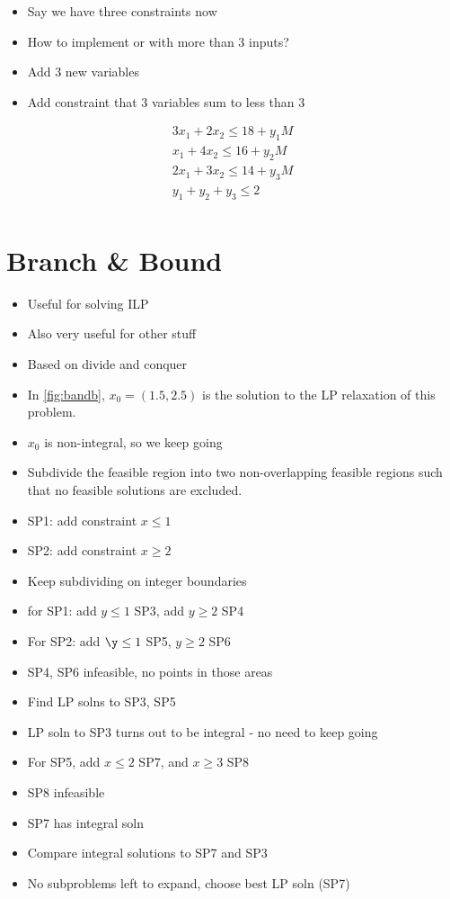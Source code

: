 \documentclass[12pt, letter]{article}
\begin{document}
\begin{itemize}
	\item Say we have three constraints now
	\item How to implement or with more than 3 inputs?
	\item Add 3 new variables
	\item Add constraint that 3 variables sum to less than 3
\end{itemize}
\begin{gather*}
3x_1+2x_2 \le 18 + y_1M \\
x_1+4x_2 \le 16 +y_2M\\
2x_1+3x_2 \le 14 +y_3M\\
y_1+y_2+y_3 \le 2\\
\end{gather*}

\section{Branch \& Bound}%
\label{sec:branch_&_bound}
\begin{itemize}
	\item Useful for solving ILP
	\item Also very useful for other stuff
	\item Based on divide and conquer
	\item In \ref{fig:bandb}, $x_0=(1.5, 2.5)$ is the solution to the LP relaxation of this problem.
	\item $x_0$ is non-integral, so we keep going
	\item Subdivide the feasible region into two non-overlapping feasible regions such that no feasible solutions are excluded.
	\item SP1: add constraint $x \le 1$
	\item SP2: add constraint $x \ge 2$
	\item Keep subdividing on integer boundaries
	\item for SP1: add $y\le 1$ SP3, add $y \ge 2$ SP4
	\item For SP2: add $\y \le 1$ SP5, $y\ge 2$ SP6
	\item SP4, SP6 infeasible, no points in those areas
	\item Find LP solns to SP3, SP5
	\item LP soln to SP3 turns out to be integral - no need to keep going
	\item For SP5, add $x \le 2$ SP7, and $x \ge 3$ SP8
	\item SP8 infeasible
	\item SP7 has integral soln
	\item Compare integral solutions to SP7 and SP3
	\item No subproblems left to expand, choose best LP soln (SP7)
\end{itemize}
\end{document}
